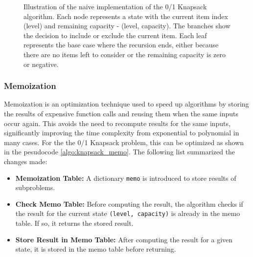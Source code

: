 \documentclass[a4paper,10pt]{article}
\newcommand{\hlt}[1]{\colorbox{color3}{#1}}
\begin{document}
\begin{figure}[h!]
  \centering
  \caption{Illustration of the naive implementation of the 0/1 Knapsack algorithm. Each node represents a state with the current item index (level) and remaining capacity - \hlt{(level, capacity)}. The branches show the decision to \hlt{include} or \hlt{exclude} the current item. Each leaf represents the base case where the recursion ends, either because there are no items left to consider or the remaining capacity is zero or negative.}
  \label{fig:01knapsack}
\end{figure}


\subsubsection{Memoization}

Memoization is an optimization technique used to speed up algorithms by storing the results of expensive function calls and \hlt{reusing} them when the same inputs occur again. This avoids the need to recompute results for the same inputs, significantly improving the time complexity from exponential to polynomial in many cases. For the the 0/1 Knapsack problem, this can be optimized as shown in the pesudocode \ref{algo:knapsack_memo}. The following list summarized the changes made:

\begin{itemize}
    \item \textbf{Memoization Table:} A dictionary \texttt{memo} is introduced to store results of subproblems.
    \item \textbf{Check Memo Table:} Before computing the result, the algorithm checks if the result for the current state \texttt{(level, capacity)} is already in the memo table. If so, it returns the stored result.
    \item \textbf{Store Result in Memo Table:} After computing the result for a given state, it is stored in the memo table before returning.
\end{itemize}
\end{document}
